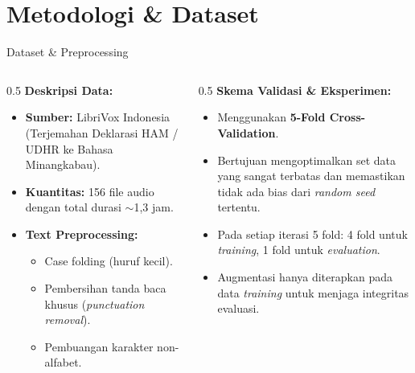 \section{Metodologi \& Dataset}

\begin{frame}{Dataset \& Preprocessing}
    \begin{columns}
        \begin{column}{0.5\textwidth}
            \textbf{Deskripsi Data:}
            \begin{itemize}
                \item \textbf{Sumber:} LibriVox Indonesia (Terjemahan Deklarasi HAM / UDHR ke Bahasa Minangkabau).
                \item \textbf{Kuantitas:} 156 file audio dengan total durasi $\sim$1,3 jam.
                \item \textbf{Text Preprocessing:}
                \begin{itemize}
                    \item Case folding (huruf kecil).
                    \item Pembersihan tanda baca khusus (\textit{punctuation removal}).
                    \item Pembuangan karakter non-alfabet.
                \end{itemize}
            \end{itemize}
        \end{column}
        \begin{column}{0.5\textwidth}
            \textbf{Skema Validasi \& Eksperimen:}
            \begin{itemize}
                \item Menggunakan \textbf{5-Fold Cross-Validation}.
                \item Bertujuan mengoptimalkan set data yang sangat terbatas dan memastikan tidak ada bias dari \textit{random seed} tertentu.
                \item Pada setiap iterasi 5 fold: 4 fold untuk \textit{training}, 1 fold untuk \textit{evaluation}.
                \item Augmentasi hanya diterapkan pada data \textit{training} untuk menjaga integritas evaluasi. 
            \end{itemize}
        \end{column}
    \end{columns}
\end{frame}

